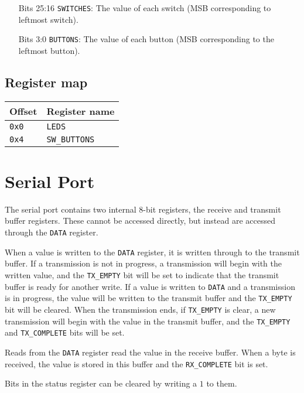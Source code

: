 \documentclass[11pt,openany]{report}
\begin{document}
\begin{enumerate}
\item[Bits 25:16] \verb|SWITCHES|: The value of each switch (MSB corresponding to leftmost switch).
\item[Bits 3:0] \verb|BUTTONS|: The value of each button (MSB corresponding to the leftmost button).
\end{enumerate}

\subsection{Register map}
\begin{center}
  \begin{tabular}{|l|l|}
    \hline
    \textbf{Offset} & \textbf{Register name} \\
    \hline
    \texttt{0x0} & \texttt{LEDS} \\
    \hline
    \texttt{0x4} & \texttt{SW\_BUTTONS} \\
    \hline
  \end{tabular}
\end{center}

\section{Serial Port}

The serial port contains two internal 8-bit registers, the receive and
transmit buffer registers. These cannot be accessed directly, but instead
are accessed through the \verb|DATA| register.

When a value is written to the \verb|DATA| register, it is written
through to the transmit buffer. If a transmission is not in progress,
a transmission will begin with the written value, and the \verb|TX_EMPTY|
bit will be set to indicate that the transmit buffer is ready for
another write. If a value is written to \verb|DATA| and a transmission
is in progress, the value will be written to the transmit buffer and
the \verb|TX_EMPTY| bit will be cleared. When the transmission
ends, if \verb|TX_EMPTY| is clear, a new transmission will begin
with the value in the transmit buffer, and the \verb|TX_EMPTY|
and \verb|TX_COMPLETE| bits will be set.

Reads from the \verb|DATA| register read the value in the receive buffer.
When a byte is received, the value is stored in this buffer and the
\verb|RX_COMPLETE| bit is set.

Bits in the status register can be cleared by writing a $1$ to
them.
\end{document}
